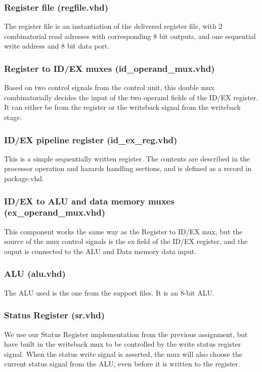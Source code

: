 \documentclass[11pt]{report}
\begin{document}
\subsubsection*{Register file (regfile.vhd)}
The register file is an instantiation of the delivered register file, with 
2 combinatorial read adresses with corresponding 8 bit outputs, and one sequential
write address and 8 bit data port.

\subsubsection*{Register to ID/EX muxes (id\_operand\_mux.vhd)}
Based on two control signals from the control unit, this double mux combinatorially
decides the input of the two operand fields of the ID/EX register. It can 
either be from the register or the writeback signal from the writeback stage.

\subsubsection*{ID/EX pipeline register (id\_ex\_reg.vhd)}
This is a simple sequentially written register. The contents are described in the 
processor operation and hazards handling sections, and is defined as a record in package.vhd. 
\subsubsection*{ID/EX to ALU and data memory muxes (ex\_operand\_mux.vhd)}
This component works the same way as the Register to ID/EX mux, but the source of the 
mux control signals is the ex field of the ID/EX register, and the ouput is connected
to the ALU and Data memory data input.

\subsubsection*{ALU (alu.vhd)}
The ALU used is the one from the support files. It is an 8-bit ALU.
\subsubsection*{Status Register (sr.vhd)}
We use our Status Register implementation from the previous assignment, but have
built in the writeback mux to be controlled by the write status register signal.
When the status write signal is asserted, the mux will also choose the current 
status signal from the ALU, even before it is written to the register.
\end{document}
